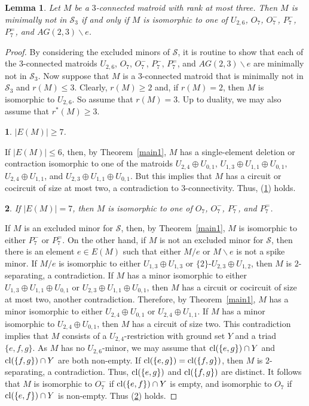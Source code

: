 \documentclass[11pt]{amsart}
\newtheorem{lemma}[theorem]{Lemma}
\newtheorem{sublemma}{}[theorem]
\numberwithin{equation}{section} %
\newcommand{\cl}{{\rm cl}}
\newcommand{\cS}{\mathcal{S}}
\begin{document}
\begin{lemma}
Let $M$ be a $3$-connected matroid with rank at most three. Then $M$ is minimally not in $\cS_3$ if and only if $M$ is isomorphic to one of $U_{2, 6}$, $O_7$, $O_7^-$, $P_7^-$, $P_7^=$, and $AG(2, 3)\backslash e$.
\label{most3}
\end{lemma}

\begin{proof}
By considering the excluded minors of $\cS$, it is routine to show that each of the $3$-connected matroids $U_{2, 6}$, $O_7$, $O_7^-$, $P_7^-$, $P_7^=$, and $AG(2, 3)\backslash e$ are minimally not in $\cS_3$. Now suppose that $M$ is a $3$-connected matroid that is minimally not in $\cS_3$ and $r(M)\le 3$. Clearly, $r(M)\ge 2$ and, if $r(M)=2$, then $M$ is isomorphic to $U_{2, 6}$. So assume that $r(M)=3$. Up to duality, we may also assume that $r^*(M) \geq 3$.

\begin{sublemma}
$|E(M)|\geq 7$.
\label{most7}
\end{sublemma}

If $|E(M)|\leq6$, then, by Theorem~\ref{main1}, $M$ has a single-element deletion or contraction isomorphic to one of the matroids $U_{2, 4}\oplus U_{0, 1}$, $U_{1, 3}\oplus U_{1, 1}\oplus U_{0, 1}$, $U_{2, 4}\oplus U_{1, 1}$, and $U_{2, 3}\oplus U_{1, 1}\oplus U_{0, 1}$. But this implies that $M$ has a circuit or cocircuit of size at most two, a contradiction to $3$-connectivity. Thus, (\ref{most7}) holds.

\begin{sublemma}
If $|E(M)|=7$, then $M$ is isomorphic to one of $O_7$, $O_7^{-}$, $P_7^{-}$, and $P_7^{=}$.
\label{seven}
\end{sublemma}

If $M$ is an excluded minor for $\cS$, then, by Theorem~\ref{main1}, $M$ is isomorphic to either $P_7^{-}$ or $P_7^{=}$. On the other hand, if $M$ is not an excluded minor for $\cS$, then there is an element $e\in E(M)$ such that either $M/e$ or $M\backslash e$ is not a spike minor. If $M/e$ is isomorphic to either $U_{1, 3}\oplus U_{1, 3}$ or $\{2\}$-$U_{2, 3}\oplus U_{1, 2}$, then $M$ is $2$-separating, a contradiction. If $M$ has a minor isomorphic to either $U_{1, 3}\oplus U_{1, 1}\oplus U_{0, 1}$ or $U_{2, 3}\oplus U_{1, 1}\oplus U_{0, 1}$, then $M$ has a circuit or cocircuit of size at most two, another contradiction. Therefore, by Theorem~\ref{main1}, $M$ has a minor isomorphic to either $U_{2, 4}\oplus U_{0, 1}$ or $U_{2, 4}\oplus U_{1, 1}$. If $M$ has a minor isomorphic to $U_{2, 4}\oplus U_{0, 1}$, then $M$ has a circuit of size two. This contradiction implies that $M$ consists of a $U_{2, 4}$-restriction with ground set $Y$ and a triad $\{e, f, g\}$. As $M$ has no $U_{2, 6}$-minor, we may assume that $\cl(\{e, g\})\cap Y$ and $\cl(\{f, g\})\cap Y$ are both non-empty. If $\cl(\{e, g\})=\cl(\{f, g\})$, then $M$ is $2$-separating, a contradiction. Thus, $\cl(\{e, g\})$ and $\cl(\{f, g\})$ are distinct. It follows that $M$ is isomorphic to $O_7^-$ if $\cl(\{e,f\}) \cap Y$ is empty, and isomorphic to $O_7$ if $\cl(\{e,f\}) \cap Y$ is non-empty. Thus (\ref{seven}) holds.


\end{proof}
\end{document}
